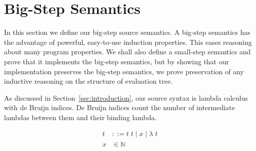 \section{\ce Big-Step Semantics} \label{sec:cem_big}

In this section we define our big-step source semantics. A big-step semantics
has the advantage of powerful, easy-to-use induction properties. This eases
reasoning about many program properties. We shall also define a small-step
semantics and prove that it implements the big-step semantics, but by showing
that our implementation preserves the big-step semantics, we prove preservation
of any inductive reasoning on the structure of evaluation tree.  

As discussed in Section~\ref{sec:introduction}, our source syntax is lambda calculus with
de Bruijn indices. De Bruijn indices count the number of intermediate lambdas
between them and their binding lambda.  

\begin{align*}
 t &::= t \; t \; | \; x \; | \;  \lambda \; t \\
 x &\in \mathbb{N}
\end{align*}

